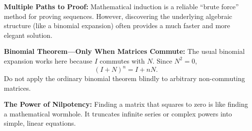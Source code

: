 \begin{takeaways}
\item \textbf{Multiple Paths to Proof:} Mathematical induction is a reliable ``brute force'' method for proving sequences. However, discovering the underlying algebraic structure (like a binomial expansion) often provides a much faster and more elegant solution.
\item \textbf{Binomial Theorem---Only When Matrices Commute:} The usual binomial expansion works here because $I$ commutes with $N$. Since $N^2=0$,
\[
(I+N)^n=I+nN.
\]
Do not apply the ordinary binomial theorem blindly to arbitrary non-commuting matrices.
\item \textbf{The Power of Nilpotency:} Finding a matrix that squares to zero is like finding a mathematical wormhole. It truncates infinite series or complex powers into simple, linear equations. 
\end{takeaways}

